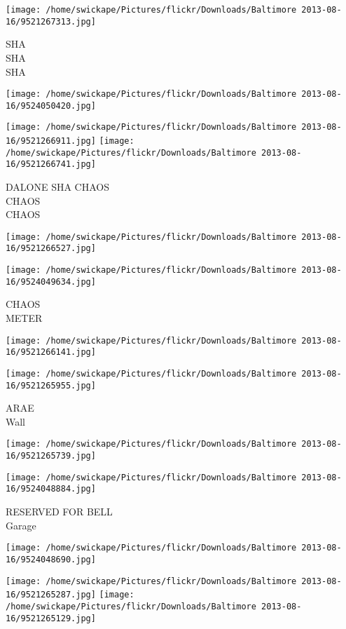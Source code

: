 \documentclass[10pt,letterpaper]{article}
\begin{document}
\texttt{[image: /home/swickape/Pictures/flickr/Downloads/Baltimore 2013-08-16/9521267313.jpg]}

SHA\\
SHA\\
SHA
\pagebreak

\texttt{[image: /home/swickape/Pictures/flickr/Downloads/Baltimore 2013-08-16/9524050420.jpg]}

\vspace{0.25in}
\texttt{[image: /home/swickape/Pictures/flickr/Downloads/Baltimore 2013-08-16/9521266911.jpg]}
\texttt{[image: /home/swickape/Pictures/flickr/Downloads/Baltimore 2013-08-16/9521266741.jpg]}

DALONE SHA CHAOS\\
CHAOS\\
CHAOS
\pagebreak

\texttt{[image: /home/swickape/Pictures/flickr/Downloads/Baltimore 2013-08-16/9521266527.jpg]}

\vspace{0.25in}
\texttt{[image: /home/swickape/Pictures/flickr/Downloads/Baltimore 2013-08-16/9524049634.jpg]}

CHAOS\\
METER
\pagebreak

\texttt{[image: /home/swickape/Pictures/flickr/Downloads/Baltimore 2013-08-16/9521266141.jpg]}

\vspace{0.25in}
\texttt{[image: /home/swickape/Pictures/flickr/Downloads/Baltimore 2013-08-16/9521265955.jpg]}

ARAE\\
Wall
\pagebreak

\texttt{[image: /home/swickape/Pictures/flickr/Downloads/Baltimore 2013-08-16/9521265739.jpg]}

\vspace{0.25in}
\texttt{[image: /home/swickape/Pictures/flickr/Downloads/Baltimore 2013-08-16/9524048884.jpg]}

RESERVED FOR BELL\\
Garage
\pagebreak

\texttt{[image: /home/swickape/Pictures/flickr/Downloads/Baltimore 2013-08-16/9524048690.jpg]}

\vspace{0.25in}
\texttt{[image: /home/swickape/Pictures/flickr/Downloads/Baltimore 2013-08-16/9521265287.jpg]}
\texttt{[image: /home/swickape/Pictures/flickr/Downloads/Baltimore 2013-08-16/9521265129.jpg]}
\end{document}
